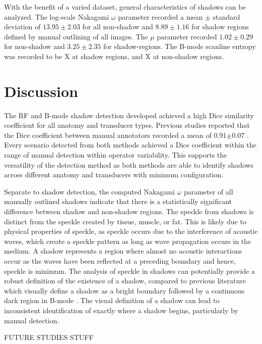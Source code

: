 \documentclass[preprint,5p,authoryear]{elsarticle}
\begin{document}
With the benefit of a varied dataset, general characteristics of shadows can be analyzed. The log-scale Nakagami $\omega$ parameter recorded a mean $\pm$ standard deviation of $13.95\pm2.03$ for all non-shadow and $8.89\pm1.16$ for shadow regions defined by manual outlining of all images. The $\mu$ parameter recorded $1.02\pm0.29$ for non-shadow and $3.25\pm2.35$ for shadow-regions. The B-mode scanline entropy was recorded to be X at shadow regions, and X at non-shadow regions.

\section*{Discussion}
\label{Discuss}
The RF and B-mode shadow detection developed achieved a high Dice similarity coefficient for all anatomy and transducer types. Previous studies reported that the Dice coefficient between manual annotators recorded a mean of 0.91$\pm$0.07 \citep{Hellier2010}. Every scenario detected from both methods achieved a Dice coefficient within the range of manual detection within operator variability. This supports the versatility of the detection method as both methods are able to identify shadows across different anatomy and transducers with minimum configuration. 

Separate to shadow detection, the computed Nakagami $\omega$ parameter of all manually outlined shadows indicate that there is a statistically significant difference between shadow and non-shadow regions. The speckle from shadows is distinct from the speckle created by tissue, muscle, or fat. This is likely due to physical properties of speckle, as speckle occurs due to the interference of acoustic waves, which create a speckle pattern as long as wave propagation occurs in the medium. A shadow represents a region where almost no acoustic interactions occur as the waves have been reflected at a preceding boundary and hence, speckle is minimum. The analysis of speckle in shadows can potentially provide a robust definition of the existence of a shadow, compared to previous literature which visually define a shadow as a bright boundary followed by a continuous dark region in B-mode \citep{Kremkau1986}. The visual definition of a shadow can lead to inconsistent identification of exactly where a shadow begins, particularly by manual detection.

FUTURE STUDIES STUFF

\end{document}
